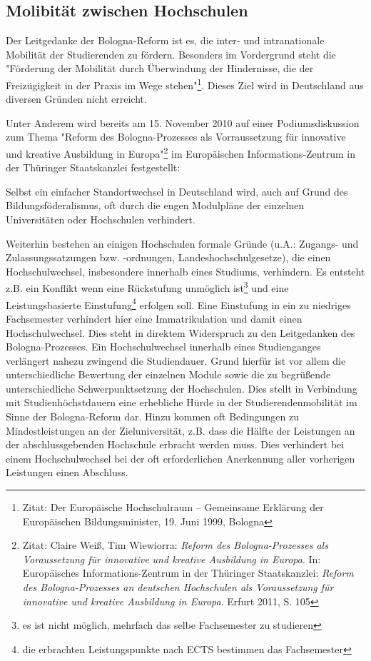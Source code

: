 \newpage
\subsection{Molibität zwischen Hochschulen}

Der Leitgedanke der Bologna-Reform ist es, die inter- und intranationale
Mobilität der Studierenden zu fördern. Besonders im Vordergrund steht die
"Förderung der Mobilität durch Überwindung der Hindernisse, die der
Freizügigkeit in der Praxis im Wege stehen"\footnote{Zitat: Der Europäische Hochschulraum – Gemeinsame Erklärung der Europäischen Bildungsminister, 19. Juni 1999, Bologna}.  Dieses Ziel wird in
Deutschland aus diversen Gründen nicht erreicht.

Unter Anderem wird bereits am 15. November 2010 auf einer
Podiumsdiskussion zum Thema "Reform des Bologna-Prozesses als Vorraussetzung
für innovative und kreative Ausbildung in Europa"\footnote{Zitat: Claire Weiß, Tim Wiewiorra: \textit{Reform des Bologna-Prozesses als Voraussetzung
  für innovative und kreative Ausbildung in Europa}. In: Europäisches
  Informations-Zentrum in der Thüringer Staatskanzlei:
  \textit{Reform des Bologna-Prozesses an deutschen Hochschulen als Voraussetzung für
  innovative und kreative Ausbildung in Europa}. Erfurt 2011, S. 105} im Europäischen
Informations-Zentrum in der Thüringer Staatskanzlei festgestellt:
\begin{displayquote}
 Selbst ein einfacher Standortwechsel in Deutschland wird, auch auf Grund des
 Bildungsföderalismus, oft durch die engen Modulpläne der einzelnen
 Universitäten oder Hochschulen verhindert.
\end{displayquote}
Weiterhin bestehen an einigen Hochschulen formale Gründe (u.A.: Zugangs- und
Zulassungssatzungen bzw. -ordnungen, Landeshochschulgesetze), die einen
Hochschulwechsel, insbesondere innerhalb eines Studiums, verhindern. Es entsteht
z.B. ein Konflikt wenn eine Rückstufung unmöglich ist\footnote{es ist nicht
möglich, mehrfach das selbe Fachsemester zu studieren} und eine
Leistungsbasierte Einstufung\footnote{die erbrachten Leistungspunkte nach ECTS
bestimmen das Fachsemester} erfolgen soll. Eine Einstufung in ein zu niedriges
Fachsemester verhindert hier eine Immatrikulation und damit einen
Hochschulwechsel. Dies steht in direktem Widerspruch zu den Leitgedanken des
Bologna-Prozesses.
Ein Hochschulwechsel innerhalb eines Studienganges verlängert nahezu zwingend
die Studiendauer. Grund hierfür ist vor allem die unterschiedliche Bewertung der
einzelnen Module sowie die zu begrüßende unterschiedliche Schwerpunktsetzung der
Hochschulen. Dies stellt in Verbindung mit Studienhöchstdauern eine erhebliche
Hürde in der Studierendenmobilität im Sinne der Bologna-Reform dar.
\newpage
Hinzu kommen oft Bedingungen zu Mindestleistungen an der Zieluniversität, z.B.
dass die Hälfte der Leistungen an der abschlussgebenden Hochschule erbracht
werden muss. Dies verhindert bei einem Hochschulwechsel bei der oft
erforderlichen Anerkennung aller vorherigen Leistungen einen Abschluss.

